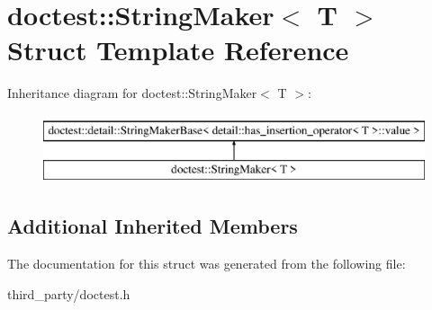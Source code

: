 \hypertarget{structdoctest_1_1_string_maker}{}\section{doctest\+::String\+Maker$<$ T $>$ Struct Template Reference}
\label{structdoctest_1_1_string_maker}
Inheritance diagram for doctest\+::String\+Maker$<$ T $>$\+:\begin{figure}[H]
\begin{center}
\leavevmode
\includegraphics[height=2.000000cm]{structdoctest_1_1_string_maker}
\end{center}
\end{figure}
\subsection*{Additional Inherited Members}


The documentation for this struct was generated from the following file\+:\begin{DoxyCompactItemize}
\item 
third\+\_\+party/doctest.\+h\end{DoxyCompactItemize}
